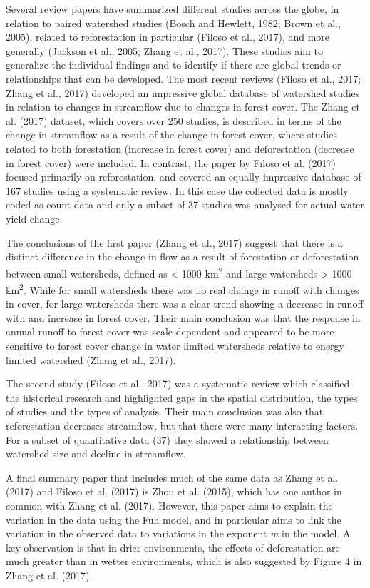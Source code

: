 \documentclass[]{elsarticle} %
\begin{document}
Several review papers have summarized different studies across the
globe, in relation to paired watershed studies (Bosch and Hewlett, 1982;
Brown et al., 2005), related to reforestation in particular (Filoso et
al., 2017), and more generally (Jackson et al., 2005; Zhang et al.,
2017). These studies aim to generalize the individual findings and to
identify if there are global trends or relationships that can be
developed. The most recent reviews (Filoso et al., 2017; Zhang et al.,
2017) developed an impressive global database of watershed studies in
relation to changes in streamflow due to changes in forest cover. The
Zhang et al. (2017) dataset, which covers over 250 studies, is described
in terms of the change in streamflow as a result of the change in forest
cover, where studies related to both forestation (increase in forest
cover) and deforestation (decrease in forest cover) were included. In
contrast, the paper by Filoso et al. (2017) focused primarily on
reforestation, and covered an equally impressive database of 167 studies
using a systematic review. In this case the collected data is mostly
coded as count data and only a subset of 37 studies was analysed for
actual water yield change.

The conclusions of the first paper (Zhang et al., 2017) suggest that
there is a distinct difference in the change in flow as a result of
forestation or deforestation between small watersheds, defined as
\textless{} 1000 km\textsuperscript{2} and large watersheds
\textgreater{} 1000 km\textsuperscript{2}. While for small watersheds
there was no real change in runoff with changes in cover, for large
watersheds there was a clear trend showing a decrease in runoff with and
increase in forest cover. Their main conclusion was that the response in
annual runoff to forest cover was scale dependent and appeared to be
more sensitive to forest cover change in water limited watersheds
relative to energy limited watershed (Zhang et al., 2017).

The second study (Filoso et al., 2017) was a systematic review which
classified the historical research and highlighted gaps in the spatial
distribution, the types of studies and the types of analysis. Their main
conclusion was also that reforestation decreases streamflow, but that
there were many interacting factors. For a subset of quantitative data
(37) they showed a relationship between watershed size and decline in
streamflow.

A final summary paper that includes much of the same data as Zhang et
al. (2017) and Filoso et al. (2017) is Zhou et al. (2015), which has one
author in common with Zhang et al. (2017). However, this paper aims to
explain the variation in the data using the Fuh model, and in particular
aims to link the variation in the observed data to variations in the
exponent \emph{m} in the model. A key observation is that in drier
environments, the effects of deforestation are much greater than in
wetter environments, which is also suggested by Figure 4 in Zhang et al.
(2017).
\end{document}
